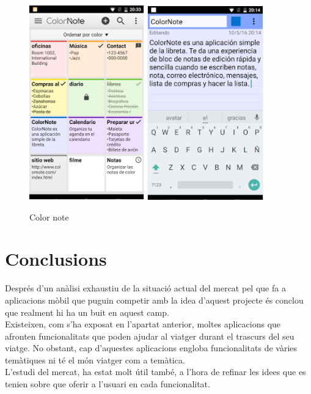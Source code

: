 \begin{itemize}
\begin{itemize}
\begin{figure}[!h]
\centering
\includegraphics[scale=0.90]{Figures/colorNote1.jpg}
\includegraphics[scale=0.90]{Figures/colorNote2.jpg}
\caption{Color note}
\end{figure}

\end{itemize}
\end{itemize}
\section{Conclusions}
Després d'un anàlisi exhaustiu de la situació actual del mercat pel que fa a aplicacions mòbil que puguin competir amb la idea d'aquest projecte és conclou que realment hi ha un buit en aquest camp.\\

Existeixen, com s'ha exposat en l'apartat anterior, moltes aplicacions que afronten funcionalitats que poden ajudar al viatger durant el trascurs del seu viatge. No obstant, cap d'aquestes aplicacions engloba funcionalitats de vàries temàtiques ni té el món viatger com a temàtica.\\

L'estudi del mercat, ha estat molt útil també, a l'hora de refinar les idees que es tenien sobre que oferir a l'usuari en cada funcionalitat.
